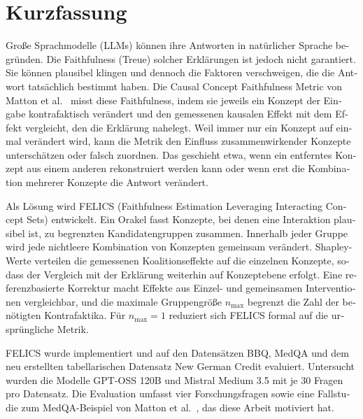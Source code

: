 
\section*{Kurzfassung}

\begin{otherlanguage}{ngerman}
	\begingroup
	\small
	\setlength{\parskip}{0.35em}

	Große Sprachmodelle (LLMs) können ihre Antworten in natürlicher Sprache
	begründen. Die Faithfulness (Treue) solcher Erklärungen ist jedoch nicht
	garantiert. Sie können plausibel klingen und dennoch die Faktoren verschweigen, die die Antwort
	tatsächlich bestimmt haben. Die Causal Concept Faithfulness Metric von Matton
	et al.~\cite{mattonWalkTalkMeasuring2024} misst diese Faithfulness, indem sie jeweils
	ein Konzept der Eingabe kontrafaktisch verändert und den gemessenen kausalen
	Effekt mit dem Effekt vergleicht, den die Erklärung nahelegt. Weil
	immer nur ein Konzept auf einmal verändert wird, kann die Metrik den Einfluss
	zusammenwirkender Konzepte unterschätzen oder falsch zuordnen. Das geschieht
	etwa, wenn ein entferntes Konzept aus einem anderen rekonstruiert werden kann
	oder wenn erst die Kombination mehrerer Konzepte die Antwort verändert.

	Als Lösung wird FELICS (Faithfulness Estimation Leveraging Interacting Concept
	Sets) entwickelt. Ein Orakel fasst Konzepte, bei denen eine Interaktion
	plausibel ist, zu begrenzten Kandidatengruppen zusammen. Innerhalb jeder Gruppe
	wird jede nichtleere Kombination von Konzepten gemeinsam verändert.
	Shapley-Werte verteilen die gemessenen Koalitionseffekte auf die einzelnen
	Konzepte, sodass der Vergleich mit der Erklärung weiterhin auf Konzeptebene
	erfolgt. Eine referenzbasierte Korrektur macht Effekte aus Einzel- und
	gemeinsamen Interventionen vergleichbar, und die maximale Gruppengröße
	$n_{\max}$ begrenzt die Zahl der benötigten Kontrafaktika. Für $n_{\max}=1$
	reduziert sich FELICS formal auf die ursprüngliche Metrik.

	FELICS wurde implementiert und auf den Datensätzen BBQ, MedQA und dem neu
	erstellten tabellarischen Datensatz New German Credit evaluiert. Untersucht
	wurden die Modelle GPT-OSS 120B und Mistral Medium 3.5 mit je 30 Fragen pro
	Datensatz. Die Evaluation umfasst vier Forschungsfragen sowie eine Fallstudie
	zum MedQA-Beispiel von Matton
	et al.~\cite{mattonWalkTalkMeasuring2024}, das diese Arbeit motiviert hat.


\end{otherlanguage}
